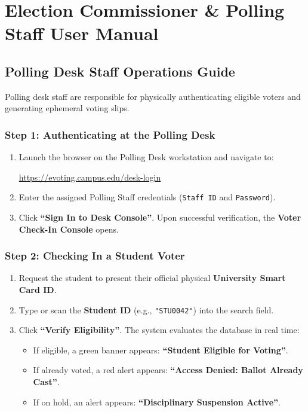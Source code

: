 \documentclass[12pt,a4paper,oneside]{report}
\begin{document}
\chapter{Election Commissioner \& Polling Staff User Manual}
\label{chap:manual}

\section{Polling Desk Staff Operations Guide}
Polling desk staff are responsible for physically authenticating eligible voters and generating ephemeral voting slips.

\subsection{Step 1: Authenticating at the Polling Desk}
\begin{enumerate}
    \item Launch the browser on the Polling Desk workstation and navigate to:
    \begin{center}
        \url{https://evoting.campus.edu/desk-login}
    \end{center}
    \item Enter the assigned Polling Staff credentials (\texttt{Staff ID} and \texttt{Password}).
    \item Click \textbf{``Sign In to Desk Console''}. Upon successful verification, the \textbf{Voter Check-In Console} opens.
\end{enumerate}

\subsection{Step 2: Checking In a Student Voter}
\begin{enumerate}
    \item Request the student to present their official physical \textbf{University Smart Card ID}.
    \item Type or scan the \textbf{Student ID} (e.g., \texttt{"STU0042"}) into the search field.
    \item Click \textbf{``Verify Eligibility''}. The system evaluates the database in real time:
    \begin{itemize}
        \item If eligible, a green banner appears: \textbf{``Student Eligible for Voting''}.
        \item If already voted, a red alert appears: \textbf{``Access Denied: Ballot Already Cast''}.
        \item If on hold, an alert appears: \textbf{``Disciplinary Suspension Active''}.
    \end{itemize}
\end{enumerate}
\end{document}
